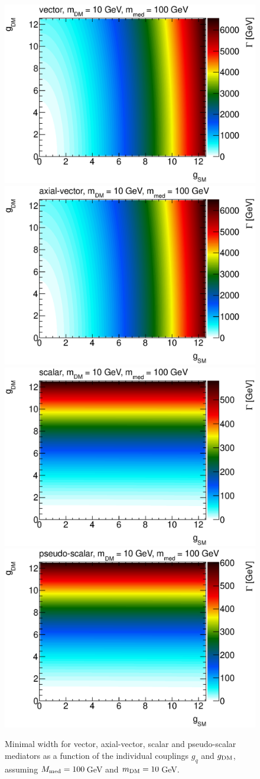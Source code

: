 \begin{figure}
\centering
\includegraphics[width=0.45\linewidth]{figures/monojet/constantwidth_V_gg100.eps}
\includegraphics[width=0.45\linewidth]{figures/monojet/constantwidth_A_gg100.eps}\\
\includegraphics[width=0.45\linewidth]{figures/monojet/constantwidth_S_gg100.eps}
\includegraphics[width=0.45\linewidth]{figures/monojet/constantwidth_P_gg100.eps}
\caption{Minimal width for vector, axial-vector, scalar and pseudo-scalar mediators as a function of the individual couplings $g_q$ and $g_{\rm{DM}}$, assuming $M_{\rm{med}}=100$\,GeV and $m_{\rm{DM}}=10$\,GeV.}
\label{fig:monojet_width100}
\end{figure}

